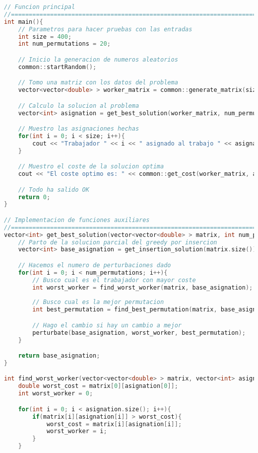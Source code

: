 \documentclass[10pt, a4paper]{article}
\theoremstyle{theorem-style}
\theoremstyle{theorem-style}
\theoremstyle{definition-style}
\theoremstyle{remark-style}
\theoremstyle{example-style}
\theoremstyle{definition-style}
\theoremstyle{remark-style}
\begin{document}
\begin{lstlisting}[language=C]
// Funcion principal
//==============================================================================
int main(){
    // Parametros para hacer pruebas con las entradas
    int size = 400;
    int num_permutations = 20;

    // Inicio la generacion de numeros aleatorios
    common::startRandom();

    // Tomo una matriz con los datos del problema
    vector<vector<double> > worker_matrix = common::generate_matrix(size);

    // Calculo la solucion al problema
    vector<int> asignation = get_best_solution(worker_matrix, num_permutations);

    // Muestro las asignaciones hechas
    for(int i = 0; i < size; i++){
        cout << "Trabajador " << i << " asignado al trabajo " << asignation[i] << endl;
    }

    // Muestro el coste de la solucion optima
    cout << "El coste optimo es: " << common::get_cost(worker_matrix, asignation) << endl;

    // Todo ha salido OK
    return 0;
}

// Implementacion de funciones auxiliares
//==============================================================================
vector<int> get_best_solution(vector<vector<double> > matrix, int num_permutations){
    // Parto de la solucion parcial del greedy por insercion
    vector<int> base_asignation = get_insertion_solution(matrix.size());

    // Hacemos el numero de perturbaciones dado
    for(int i = 0; i < num_permutations; i++){
        // Busco cual es el trabajador con mayor coste
        int worst_worker = find_worst_worker(matrix, base_asignation);
        
        // Busco cual es la mejor permutacion
        int best_permutation = find_best_permutation(matrix, base_asignation, worst_worker);

        // Hago el cambio si hay un cambio a mejor
        perturbate(base_asignation, worst_worker, best_permutation);
    }

    return base_asignation;
}

int find_worst_worker(vector<vector<double> > matrix, vector<int> asignation){
    double worst_cost = matrix[0][asignation[0]];
    int worst_worker = 0;

    for(int i = 0; i < asignation.size(); i++){
        if(matrix[i][asignation[i]] > worst_cost){
            worst_cost = matrix[i][asignation[i]];
            worst_worker = i;
        }
    }


\end{lstlisting}
\end{document}
